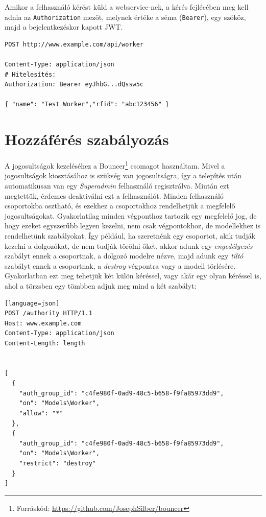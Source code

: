 \documentclass[a4paper,12pt]{thesis-ekf}
\theoremstyle{definition}
\begin{document}
    			Amikor a felhasználó kérést küld a webservice-nek, a kérés fejlécében meg kell adnia az \verb|Authorization| mezőt, melynek értéke a séma (\verb|Bearer|), egy szóköz, majd a bejelentkezéskor kapott JWT.
    			
    			\begin{lstlisting}[caption={P\'elda hiteles\'itett k\'er\'es}, captionpos=b]
POST http://www.example.com/api/worker

Content-Type: application/json
# Hitelesítés:
Authorization: Bearer eyJhbG...dQssw5c

{ "name": "Test Worker","rfid": "abc123456" }
			\end{lstlisting}
			
		\section{Hozzáférés szabályozás}
			A jogosultságok kezeléséhez a Bouncer\footnote{Forráskód: \url{https://github.com/JosephSilber/bouncer}} csomagot használtam. Mivel a jogosultságok kiosztásához is szükség van jogosultságra, így a telepítés után automatikusan van egy \emph{Superadmin} felhasználó regisztrálva. Miután  ezt megtettük, érdemes deaktiválni ezt a felhasználót. Minden felhasználó csoportokba osztható, és ezekhez a csoportokhoz rendelhetjük a megfelelő jogosultságokat. Gyakorlatilag minden végponthoz tartozik egy megfelelő jog, de hogy ezeket egyszerűbb legyen kezelni, nem csak végpontokhoz, de modellekhez is rendelhetünk szabályokat. Így például, ha szeretnénk egy csoportot, akik tudják kezelni a dolgozókat, de nem tudják törölni őket, akkor adunk egy \emph{engedélyezés} szabályt ennek a csoportnak, a dolgozó modelre nézve, majd adunk egy \emph{tiltó} szabályt ennek a csoportnak, a \emph{destroy} végpontra vagy a modell törlésére. Gyakorlatban ezt meg tehetjük két külön kéréssel, vagy akár egy olyan kéréssel is, ahol a törzsben egy tömbben adjuk meg mind a két szabályt:
			
			\begin{lstlisting}[caption={P\'elda a jogosults\'ag kezel\'esre},captionpos=b][language=json]
POST /authority HTTP/1.1
Host: www.example.com
Content-Type: application/json
Content-Length: length


[
  {
    "auth_group_id": "c4fe980f-0ad9-48c5-b658-f9fa85973dd9",
    "on": "Models\Worker",
    "allow": "*"
  },
  {
    "auth_group_id": "c4fe980f-0ad9-48c5-b658-f9fa85973dd9",
    "on": "Models\Worker",
    "restrict": "destroy"
  }
]
			\end{lstlisting}
			
\end{document}
